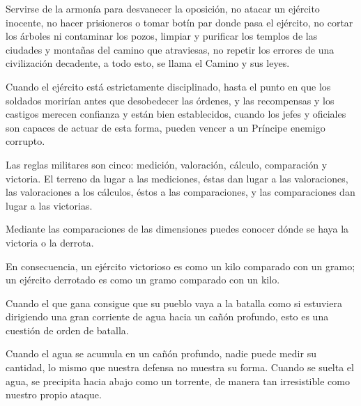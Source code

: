 Servirse de la armonía para desvanecer la oposición, no atacar un ejército inocente, no hacer prisioneros o tomar botín par donde pasa el ejército, no cortar los árboles ni contaminar los pozos, limpiar y purificar los templos de las ciudades y montañas del camino que atraviesas, no repetir los errores de una civilización decadente, a todo esto, se llama el Camino y sus leyes.

Cuando el ejército está estrictamente disciplinado, hasta el punto en que los soldados morirían antes que desobedecer las órdenes, y las recompensas y los castigos merecen confianza y están bien establecidos, cuando los jefes y oficiales son capaces de actuar de esta forma, pueden vencer a un Príncipe enemigo corrupto.

Las reglas militares son cinco: medición, valoración, cálculo, comparación y victoria. El terreno da lugar a las mediciones, éstas dan lugar a las valoraciones, las valoraciones a los cálculos, éstos a las comparaciones, y las comparaciones dan lugar a las victorias.

Mediante las comparaciones de las dimensiones puedes conocer dónde se haya la victoria o la derrota.

En consecuencia, un ejército victorioso es como un kilo comparado con un gramo; un ejército derrotado es como un gramo comparado con un kilo.

Cuando el que gana consigue que su pueblo vaya a la batalla como si estuviera dirigiendo una gran corriente de agua hacia un cañón profundo, esto es una cuestión de orden de batalla.
 
Cuando el agua se acumula en un cañón profundo, nadie puede medir su cantidad, lo mismo que nuestra defensa no muestra su forma. Cuando se suelta el agua, se precipita hacia abajo como un torrente, de manera tan irresistible como nuestro propio ataque.
 
